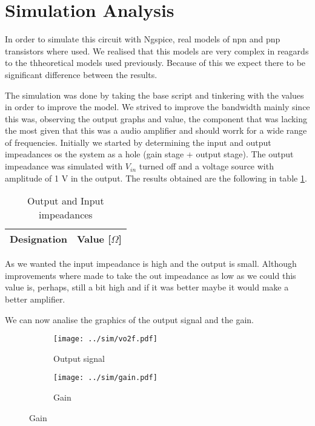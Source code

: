 \section{Simulation Analysis} \label{sec:simulation}

In order to simulate this circuit with Ngspice, real models of npn and pnp transistors where used. We realised that this models are very complex in reagards to the thheoretical models used previously. Because of this we expect there to be significant difference between the results.
\par
The simulation was done by taking the base script and tinkering with the values in order to improve the model. We strived to improve the bandwidth mainly since this was, observing the output graphs and value, the component that was lacking the most given that this was a audio amplifier and should worrk for a wide range of frequencies.
Initially we started by determining the input and output impeadances os the system as a hole (gain stage + output stage). The output impeadance was simulated with $V_{in}$ turned off and a voltage source with amplitude of 1 V in the output. The results obtained are the following in table \ref{tab:impe}.

\begin{table}[H]
  \centering
  \begin{tabular}{|c|c|}
    \hline
        {\bf Designation} & {\bf Value [$\Omega$]} \\ \hline
        
  \end{tabular}
  \caption{Output and Input impeadances} 
  \label{tab:impe}
\end{table}

As we wanted the input impeadance is high and the output is small. Although improvements where made to take the out impeadance as low as we could this value is, perhaps, still a bit high and if it was better maybe it would make a better amplifier. \par
We can now analise the graphics of the output signal and the gain.

\begin{figure}[H]
  \begin{subfigure}{.49\linewidth}
    \centering
    \texttt{[image: ../sim/vo2f.pdf]}
    \footnotesize
  \caption{Output signal}
   \label{fig:out1}
  \end{subfigure}
  \hspace{5mm}
  \begin{subfigure}{.49\linewidth}
    \centering
  \texttt{[image: ../sim/gain.pdf]}
  \caption{Gain}
  \label{fig:out2}
  \end{subfigure}
\end{figure}

